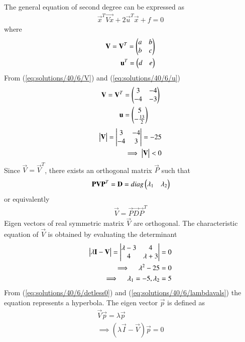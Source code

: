 The general equation of second degree can be expressed as
\begin{align}
	\vec{x}^{T}\vec{Vx} + 2\vec{u}^{T}\vec{x} + f=0   \label{eq:solutions/40/6/stdsecdeg}
\end{align}
where
\begin{align}
        \mathbf{V}=\mathbf{V}^T=\begin{pmatrix}a & b \\ b & c\end{pmatrix}   \label{eq:solutions/40/6/V}  \\
        \mathbf{u}^T=\begin{pmatrix}d &  e\end{pmatrix}            \label{eq:solutions/40/6/u}
\end{align}
From (\ref{eq:solutions/40/6/V}) and (\ref{eq:solutions/40/6/u})
\begin{align}
	\mathbf{V}=\mathbf{V}^T &= \begin{pmatrix}3 & -4 \\ -4 & -3\end{pmatrix} \\
	\mathbf{u} &= \begin{pmatrix}5 \\ -\frac{13}{2}\end{pmatrix}
\end{align}
\begin{align}
	\begin{vmatrix}\mathbf{V}\end{vmatrix}=\begin{vmatrix}3 & -4 \\ -4 & 3\end{vmatrix} =-25 \\
	\implies \begin{vmatrix}\mathbf{V}\end{vmatrix} < 0       \label{eq:solutions/40/6/detless0}
\end{align}
Since $ \vec{V} = \vec{V}^T $, there exists an orthogonal matrix $\vec{P}$ such that
\begin{align}
	\mathbf{P}\mathbf{V}\mathbf{P}^T = \mathbf{D} = diag\begin{pmatrix}\lambda_1 & \lambda_2\end{pmatrix}
\end{align}
or equivalently 
\begin{align}
	\vec{V} = \vec{P}\vec{D}\vec{P}^T
\end{align}
Eigen vectors of real symmetric matrix $\vec{V}$ are orthogonal. The characteristic equation of $\vec{V}$ is obtained by evaluating the determinant
\begin{align}
	\begin{vmatrix}\lambda\mathbf{I}-\mathbf{V}\end{vmatrix} = \begin{vmatrix}\lambda-3 & 4 \\ 4 & \lambda + 3\end{vmatrix} = 0 \\
	\implies \quad \lambda^2-25=0 \\
	\implies \quad \lambda_1=-5,\lambda_2=5   \label{eq:solutions/40/6/lambdavals}
\end{align}
From (\ref{eq:solutions/40/6/detless0}) and (\ref{eq:solutions/40/6/lambdavals}) the equation represents a hyperbola.
The eigen vector $\vec{p}$ is defined as
\begin{align}
	\vec{V}\vec{p}=\lambda\vec{p} \\
	\implies (\lambda\vec{I} - \vec{V})\vec{p}=0
\end{align}
